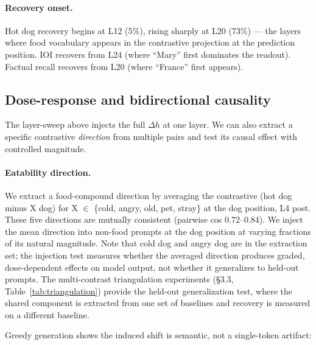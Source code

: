 \documentclass[11pt]{article}
\newcommand{\dhh}{\Delta h}
\begin{document}
\paragraph{Recovery onset.} Hot dog recovery begins at L12 (5\%),
rising sharply at L20 (73\%) --- the layers where food vocabulary appears in the
contrastive projection at the prediction position. IOI recovers from L24
(where ``Mary'' first dominates the readout). Factual recall recovers from L20
(where ``France'' first appears).

\subsection{Dose-response and bidirectional causality}

The layer-sweep above injects the full $\dhh$ at one layer. We can also extract a
specific contrastive \emph{direction} from multiple pairs and test its causal effect
with controlled magnitude.

\paragraph{Eatability direction.} We extract a food-compound direction by averaging the
contrastive (hot dog minus X dog) for X $\in$ \{cold, angry, old, pet, stray\} at
the dog position, L4 post. These five directions are mutually consistent
(pairwise cos 0.72--0.84). We inject the mean direction into non-food prompts
at the dog position at varying fractions of its natural magnitude. Note that
cold dog and angry dog are in the extraction set; the injection test measures
whether the averaged direction produces graded, dose-dependent effects on
model output, not whether it generalizes to held-out prompts. The
multi-contrast triangulation experiments (\S3.3, Table~\ref{tab:triangulation}) provide the held-out
generalization test, where the shared component is extracted from one set of
baselines and recovery is measured on a different baseline.

Greedy generation shows the induced shift is semantic, not a
single-token artifact:
\end{document}
